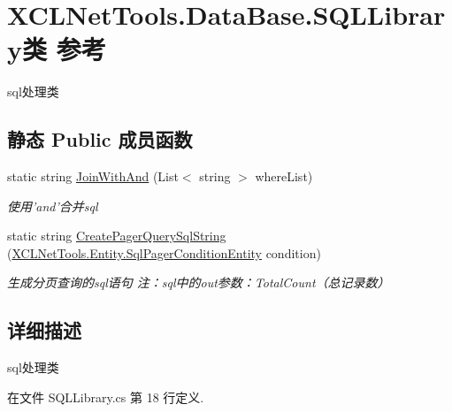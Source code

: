 \hypertarget{class_x_c_l_net_tools_1_1_data_base_1_1_s_q_l_library}{\section{X\-C\-L\-Net\-Tools.\-Data\-Base.\-S\-Q\-L\-Library类 参考}
\label{class_x_c_l_net_tools_1_1_data_base_1_1_s_q_l_library}
}


sql处理类  


\subsection*{静态 Public 成员函数}
\begin{DoxyCompactItemize}
\item 
static string \hyperlink{class_x_c_l_net_tools_1_1_data_base_1_1_s_q_l_library_acc256989f11747ac9cc52cd138088f81}{Join\-With\-And} (List$<$ string $>$ where\-List)
\begin{DoxyCompactList}\small\item\em 使用'and'合并sql \end{DoxyCompactList}\item 
static string \hyperlink{class_x_c_l_net_tools_1_1_data_base_1_1_s_q_l_library_afe56acf93da2af8c2671f8bfda89253d}{Create\-Pager\-Query\-Sql\-String} (\hyperlink{class_x_c_l_net_tools_1_1_entity_1_1_sql_pager_condition_entity}{X\-C\-L\-Net\-Tools.\-Entity.\-Sql\-Pager\-Condition\-Entity} condition)
\begin{DoxyCompactList}\small\item\em 生成分页查询的sql语句 注：sql中的out参数：\-Total\-Count（总记录数） \end{DoxyCompactList}\end{DoxyCompactItemize}


\subsection{详细描述}
sql处理类 



在文件 S\-Q\-L\-Library.\-cs 第 18 行定义.



